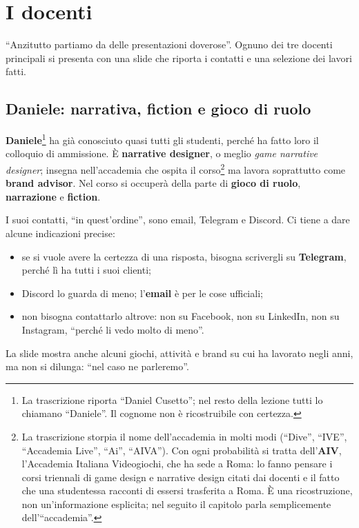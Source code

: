 \section{I docenti}
\label{a1:sec:docenti}

``Anzitutto partiamo da delle presentazioni doverose''. Ognuno dei tre docenti
principali si presenta con una slide che riporta i contatti e una selezione dei
lavori fatti.

\subsection{Daniele: narrativa, fiction e gioco di ruolo}



\textbf{Daniele}\footnote{La trascrizione riporta ``Daniel Cusetto''; nel
resto della lezione tutti lo chiamano ``Daniele''. Il cognome non è
ricostruibile con certezza.} ha già conosciuto quasi tutti gli studenti, perché
ha fatto loro il colloquio di ammissione. È \textbf{narrative designer}, o meglio
\emph{game narrative designer}; insegna nell'accademia che ospita il
corso\footnote{La trascrizione storpia il nome dell'accademia in molti modi
(``Dive'', ``IVE'', ``Accademia Live'', ``Ai'', ``AIVA''). Con ogni probabilità
si tratta dell'\textbf{AIV}, l'Accademia Italiana Videogiochi, che ha sede a
Roma: lo fanno pensare i corsi triennali di game design e narrative design citati
dai docenti e il fatto che una studentessa racconti di essersi trasferita a Roma.
È una ricostruzione, non un'informazione esplicita; nel seguito il capitolo
parla semplicemente dell'``accademia''.} ma lavora soprattutto come \textbf{brand
advisor}. Nel corso si occuperà della parte di \textbf{gioco di ruolo},
\textbf{narrazione} e \textbf{fiction}.

I suoi contatti, ``in quest'ordine'', sono email, Telegram e Discord. Ci tiene a
dare alcune indicazioni precise:
\begin{itemize}
  \item se si vuole avere la certezza di una risposta, bisogna scrivergli su
        \textbf{Telegram}, perché lì ha tutti i suoi clienti;
  \item Discord lo guarda di meno; l'\textbf{email} è per le cose ufficiali;
  \item non bisogna contattarlo altrove: non su Facebook, non su LinkedIn, non su
        Instagram, ``perché li vedo molto di meno''.
\end{itemize}
La slide mostra anche alcuni giochi, attività e brand su cui ha lavorato negli
anni, ma non si dilunga: ``nel caso ne parleremo''.

